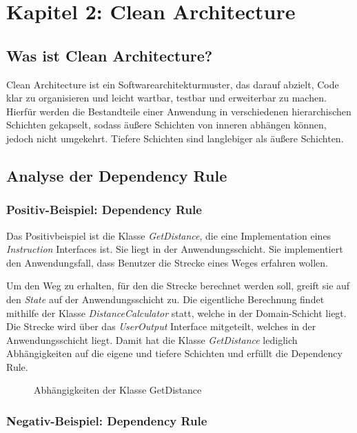 \section{Kapitel 2: Clean Architecture}

\subsection{Was ist Clean Architecture?}

Clean Architecture ist ein Softwarearchitekturmuster, das darauf abzielt, Code klar zu organisieren und leicht wartbar, testbar und erweiterbar zu machen. Hierfür werden die Bestandteile einer Anwendung in verschiedenen hierarchischen Schichten gekapselt, sodass äußere Schichten von inneren abhängen können, jedoch nicht umgekehrt. Tiefere Schichten sind langlebiger als äußere Schichten.


\subsection{Analyse der Dependency Rule}

\subsubsection{Positiv-Beispiel: Dependency Rule}

Das Positivbeispiel ist die Klasse \textit{GetDistance}, die eine Implementation eines \textit{Instruction} Interfaces ist. Sie liegt in der Anwendungsschicht.
Sie implementiert den Anwendungsfall, dass Benutzer die Strecke eines Weges erfahren wollen.

Um den Weg zu erhalten, für den die Strecke berechnet werden soll, greift sie auf den \textit{State} auf der Anwendungsschicht zu.
Die eigentliche Berechnung findet mithilfe der Klasse \textit{DistanceCalculator} statt, welche in der Domain-Schicht liegt.
 Die Strecke wird über das \textit{UserOutput} Interface mitgeteilt, welches in der Anwendungsschicht liegt.
 Damit hat die Klasse \textit{GetDistance} lediglich Abhängigkeiten auf die eigene und tiefere Schichten und erfüllt die Dependency Rule.

\begin{figure}[H]
  \centering
  
  \caption{Abhängigkeiten der Klasse GetDistance}
\end{figure}


\subsubsection{Negativ-Beispiel: Dependency Rule}

